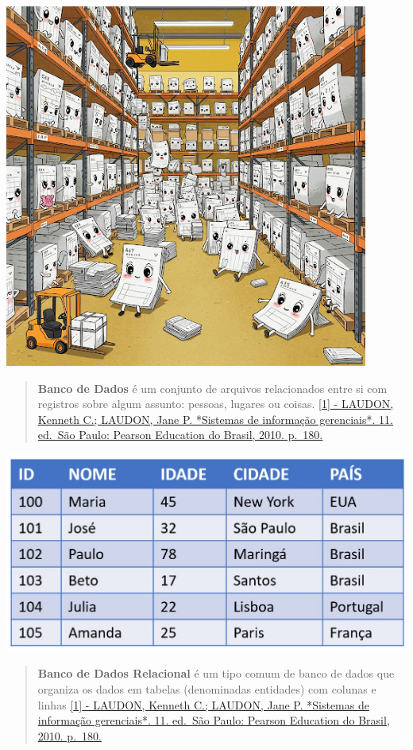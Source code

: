 \documentclass[
]{book}
\begin{document}
\includegraphics[width=4.70833in,height=\textheight]{images/5-bi/01-banco-de-dados.jpg}

\begin{quote}
\textbf{Banco de Dados} é um conjunto de arquivos relacionados entre si com registros sobre algum assunto: pessoas, lugares ou coisas. \hyperref[laudon-kenneth-c.-laudon-jane-p.-sistemas-de-informauxe7uxe3o-gerenciais.-11.-ed.-suxe3o-paulo-pearson-education-do-brasil-2010.-p.-180.]{{[}1{]} - LAUDON, Kenneth C.; LAUDON, Jane P. *Sistemas de informação gerenciais*. 11. ed.~São Paulo: Pearson Education do Brasil, 2010. p.~180.}
\end{quote}

\includegraphics{images/5-bi/07-tabela_relacional.jpg}

\begin{quote}
\textbf{Banco de Dados Relacional} é um tipo comum de banco de dados que organiza os dados em tabelas (denominadas entidades) com colunas e linhas \hyperref[laudon-kenneth-c.-laudon-jane-p.-sistemas-de-informauxe7uxe3o-gerenciais.-11.-ed.-suxe3o-paulo-pearson-education-do-brasil-2010.-p.-180.]{{[}1{]} - LAUDON, Kenneth C.; LAUDON, Jane P. *Sistemas de informação gerenciais*. 11. ed.~São Paulo: Pearson Education do Brasil, 2010. p.~180.}
\end{quote}
\end{document}
